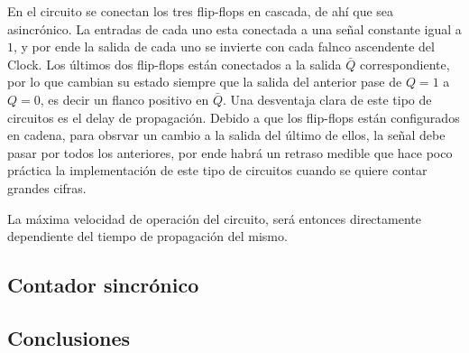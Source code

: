 En el circuito se conectan los tres flip-flops en cascada, de ahí que sea asincrónico. La entradas de cada uno esta conectada a una señal constante igual a $1$, y por ende la salida de cada uno se invierte con cada falnco ascendente del Clock. Los últimos dos flip-flops están conectados a la salida $\bar{Q}$ correspondiente, por lo que cambian su estado siempre que la salida del anterior pase de $Q = 1$ a $Q = 0$, es decir un flanco positivo en $\bar{Q}$. Una desventaja clara de este tipo de circuitos es el delay de propagación. Debido a que los flip-flops están configurados en cadena, para obsrvar un cambio a la salida del último de ellos, la señal debe pasar por todos los anteriores, por ende habrá un retraso medible que hace poco práctica la implementación de este tipo de circuitos cuando se quiere contar grandes cifras. 


La máxima velocidad de operación del circuito, será entonces directamente dependiente del tiempo de propagación del mismo. 


\subsection{Contador sincrónico}



\subsection{Conclusiones}

